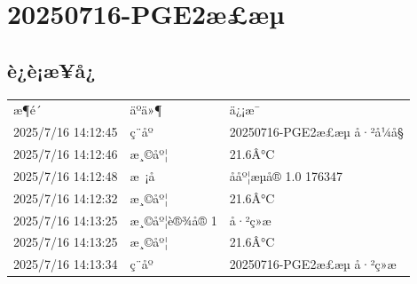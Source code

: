 \documentclass[UTF8,10pt,a4paper,fontset=fandol]{ctexart}
\newcommand{\fieldvalue}[1]{#1}
\begin{document}
\newpage

\section*{20250716-PGE2æ£æµ}

\subsection*{è¿è¡æ¥å¿}

\begin{tabularx}{\textwidth}{@{}l l X@{}}
æ¶é´ & äºä»¶ & ä¿¡æ¯ \\
\fieldvalue{2025/7/16 14:12:45} &
\fieldvalue{ç¨åº} &
\fieldvalue{20250716-PGE2æ£æµ å·²å¼å§} \\

\fieldvalue{2025/7/16 14:12:46} &
\fieldvalue{æ¸©åº¦} &
\fieldvalue{21.6Â°C} \\

\fieldvalue{2025/7/16 14:12:48} &
\fieldvalue{æ ¡å} &
\fieldvalue{ååº¦æµå® 1.0 176347} \\

\fieldvalue{2025/7/16 14:12:32} &
\fieldvalue{æ¸©åº¦} &
\fieldvalue{21.6Â°C} \\

\fieldvalue{2025/7/16 14:13:25} &
\fieldvalue{æ¸©åº¦è®¾å® 1} &
\fieldvalue{å·²ç»æ} \\

\fieldvalue{2025/7/16 14:13:25} &
\fieldvalue{æ¸©åº¦} &
\fieldvalue{21.6Â°C} \\

\fieldvalue{2025/7/16 14:13:34} &
\fieldvalue{ç¨åº} &
\fieldvalue{20250716-PGE2æ£æµ å·²ç»æ}
\end{tabularx}
\end{document}
